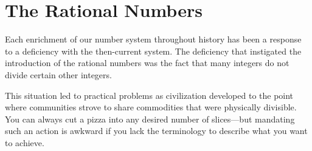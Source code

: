 \section{The Rational Numbers}
\label{sec:rationals}

Each enrichment of our number system throughout history has been a
response to a deficiency with the then-current system.  The deficiency
that instigated the introduction of the rational numbers was the fact
that many integers do not divide certain other integers.

This situation led to practical problems as civilization developed to
the point where communities strove to share commodities that were
physically divisible.  You can always cut a pizza into any desired
number of slices---but mandating such an action is awkward if you lack
the terminology to describe what you want to achieve.

